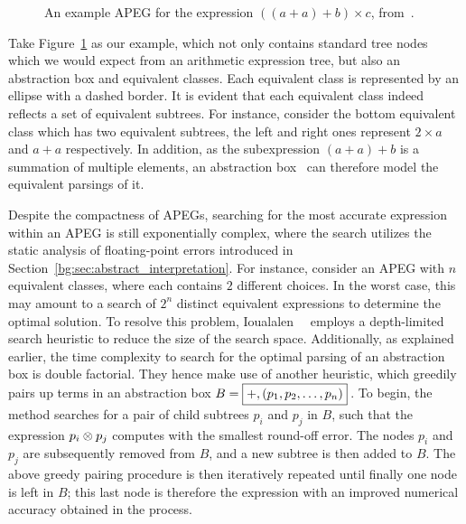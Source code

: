 \begin{figure}[ht]
    \caption{%
        An example APEG for the expression $\left( \left( a + a \right) + b
        \right) \times c$, from~\cite{martel12}.
    }\label{bg:fig:apeg}
\end{figure}
Take Figure~\ref{bg:fig:apeg} as our example, which not only contains standard
tree nodes which we would expect from an arithmetic expression tree, but
also an abstraction box and equivalent classes.  Each equivalent class is
represented by an ellipse with a dashed border.  It is evident that each
equivalent class indeed reflects a set of equivalent subtrees.  For instance,
consider the bottom equivalent class which has two equivalent subtrees, the
left and right ones represent $2 \times a$ and $a + a$ respectively.  In
addition, as the subexpression $(a + a) + b$ is a summation of multiple
elements, an abstraction box \, can therefore model the
equivalent parsings of it.

Despite the compactness of APEGs, searching for the most accurate
expression within an APEG is still exponentially complex, where the search
utilizes the static analysis of floating-point errors introduced in
Section~\ref{bg:sec:abstract_interpretation}.  For instance, consider an APEG
with $n$ equivalent classes, where each contains $2$ different choices.  In
the worst case, this may amount to a search of $2^n$ distinct equivalent
expressions to determine the optimal solution.  To resolve this problem,
Ioualalen~\etal~\cite{ioualalen} employs a depth-limited search heuristic
to reduce the size of the search space\footnotemark[2].  Additionally, as
explained earlier, the time complexity to search for the optimal parsing of an
abstraction box is double factorial.  They hence make use of another heuristic,
which greedily pairs up terms in an abstraction box $B = \text{\fbox{$+,
\left(p_1, p_2, \mathellipsis, p_n\right)$}}$\,.  To begin, the method searches
for a pair of child subtrees $p_i$ and $p_j$ in $B$, such that the expression
$p_i \otimes p_j$ computes with the smallest round-off error.  The nodes
$p_i$ and $p_j$ are subsequently removed from $B$, and a new subtree
is then added to $B$.  The above greedy pairing procedure is then iteratively
repeated until finally one node is left in $B$; this last node is therefore
the expression with an improved numerical accuracy obtained in the process.

